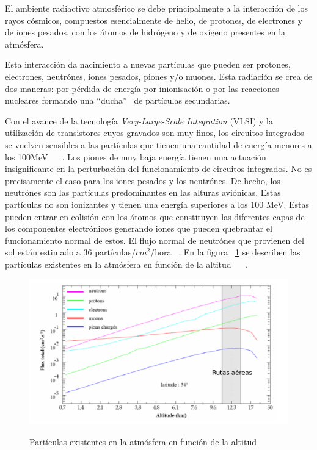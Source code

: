 El ambiente radiactivo atmosférico se debe principalmente a la interacción de los rayos cósmicos, compuestos esencialmente de helio, de protones, de electrones y de iones pesados, con los átomos de hidrógeno y de oxígeno presentes en la atmósfera.

Esta interacción da nacimiento a nuevas partículas que pueden ser protones, electrones, neutrónes, iones pesados, piones y/o muones. Esta radiación se crea de dos maneras:  por pérdida de energía por inionisación o  por las reacciones nucleares formando una ``ducha'' \mbox{ }de partículas secundarias. 

Con el avance de la tecnología \textit{Very-Large-Scale Integration} (VLSI) y la utilización de transistores cuyos gravados son muy finos, los circuitos integrados se vuelven sensibles a las partículas que tienen una cantidad de energía menores a los 100MeV ~\cite{taber1995}
~\cite{taber1993single}. Los piones de muy baja energía tienen una actuación insignificante en la perturbación del funcionamiento de circuitos integrados. No es precisamente el caso para los iones pesados y los neutrónes. De hecho, los neutrónes son las partículas predominantes en las alturas aviónicas. Estas partículas no son ionizantes y tienen una energía superiores a los 100 MeV. Estas pueden entrar en colisión con los átomos que constituyen las diferentes capas de los componentes electrónicos generando iones que pueden quebrantar el funcionamiento normal de estos. El flujo normal de neutrónes que provienen del sol están estimado a 36 partículas/$cm^2$/hora ~\cite{standard2001measurement}. En la  figura ~\ref{Alturas} se describen las partículas existentes en la atmósfera en función de la altitud ~\cite{o1971natural} ~\cite{o1978luin}. 



\begin{figure}[H]
	\centering
	\includegraphics[width=1 \textwidth]{img/Alturas.pdf}
	\caption{Partículas existentes en la atmósfera en función de la altitud   }\cite{mansour2012methodes}
	\label{Alturas}
\end{figure}